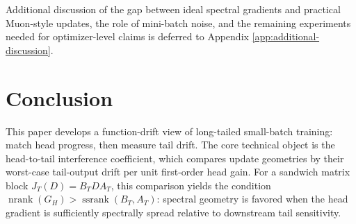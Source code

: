 \documentclass{article}
\theoremstyle{definition}
\newcommand{\nrank}{\operatorname{nrank}}
\newcommand{\ssrank}{\operatorname{ssrank}}
\begin{document}
Additional discussion of the gap between ideal spectral gradients and practical Muon-style updates, the role of mini-batch noise, and the remaining experiments needed for optimizer-level claims is deferred to Appendix \ref{app:additional-discussion}.

\section{Conclusion}

This paper develops a function-drift view of long-tailed small-batch training: match head progress, then measure tail drift. The core technical object is the head-to-tail interference coefficient, which compares update geometries by their worst-case tail-output drift per unit first-order head gain. For a sandwich matrix block \(J_T(D)=B_TDA_T\), this comparison yields the condition \(\nrank(G_H)>\ssrank(B_T,A_T)\): spectral geometry is favored when the head gradient is sufficiently spectrally spread relative to downstream tail sensitivity.
\end{document}
